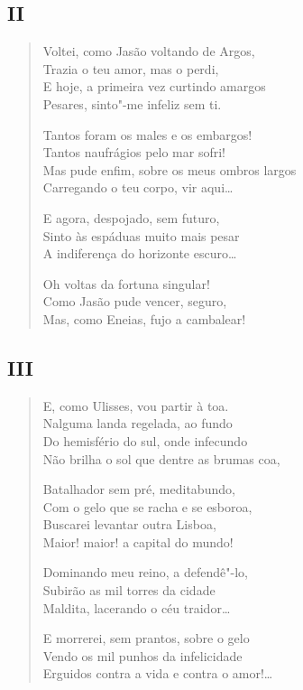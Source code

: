 \medskip
\subsection*{II}

\begin{verse}
Voltei, como Jasão voltando de Argos,\\
Trazia o teu amor, mas o perdi,\\
E hoje, a primeira vez curtindo amargos\\
Pesares, sinto"-me infeliz sem ti.

Tantos foram os males e os embargos!\\
Tantos naufrágios pelo mar sofri!\\
Mas pude enfim, sobre os meus ombros largos\\
Carregando o teu corpo, vir aqui\ldots{}

E agora, despojado, sem futuro,\\
Sinto às espáduas muito mais pesar\\
A indiferença do horizonte escuro\ldots{}

Oh voltas da fortuna singular!\\
Como Jasão pude vencer, seguro,\\
Mas, como Eneias, fujo a cambalear!
\end{verse}

\medskip
\subsection*{III}

\begin{verse}
E, como Ulisses, vou partir à toa.\\
Nalguma landa regelada, ao fundo\\
Do hemisfério do sul, onde infecundo\\
Não brilha o sol que dentre as brumas coa,

Batalhador sem pré, meditabundo,\\
Com o gelo que se racha e se esboroa,\\
Buscarei levantar outra Lisboa,\\
Maior! maior! a capital do mundo!

Dominando meu reino, a defendê"-lo,\\
Subirão as mil torres da cidade\\
Maldita, lacerando o céu traidor\ldots{}

E morrerei, sem prantos, sobre o gelo\\
Vendo os mil punhos da infelicidade\\
Erguidos contra a vida e contra o amor!\ldots{}
\end{verse}

